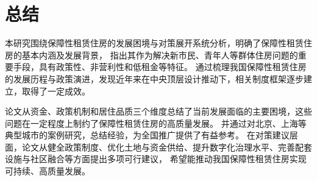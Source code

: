 \section{总结}
本研究围绕保障性租赁住房的发展困境与对策展开系统分析，明确了保障性租赁住房的基本内涵及发展背景，
指出其作为解决新市民、青年人等群体住房问题的重要手段，具有政策性、非营利性和低租金等特征。
通过梳理我国保障性租赁住房的发展历程与政策演进，发现近年来在中央顶层设计推动下，相关制度框架逐步建立，取得了一定成效。

论文从资金、政策机制和居住品质三个维度总结了当前发展面临的主要困境，这些问题在一定程度上制约了保障性租赁住房的高质量发展。
并通过对北京、上海等典型城市的案例研究，总结经验，为全国推广提供了有益参考。
在对策建议层面，论文从健全政策制度、优化土地与资金供给、提升数字化治理水平、完善配套设施与社区融合等方面提出多项可行建议，
希望能推动我国保障性租赁住房实现可持续、高质量发展。